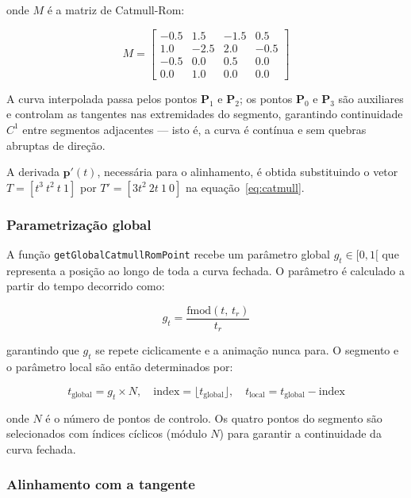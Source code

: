 \documentclass[12pt,a4paper]{article}
\begin{document}
onde $M$ é a matriz de Catmull-Rom:

\begin{equation}
    M = \begin{bmatrix}
        -0.5 &  1.5 & -1.5 &  0.5 \\
         1.0 & -2.5 &  2.0 & -0.5 \\
        -0.5 &  0.0 &  0.5 &  0.0 \\
         0.0 &  1.0 &  0.0 &  0.0
    \end{bmatrix}
\end{equation}

A curva interpolada passa pelos pontos $\mathbf{P}_1$ e $\mathbf{P}_2$; os pontos $\mathbf{P}_0$ e $\mathbf{P}_3$ são auxiliares e controlam as tangentes nas extremidades do segmento, garantindo continuidade $C^1$ entre segmentos adjacentes — isto é, a curva é contínua e sem quebras abruptas de direção.

A derivada $\mathbf{p}'(t)$, necessária para o alinhamento, é obtida substituindo o vetor $T = [t^3\ t^2\ t\ 1]$ por $T' = [3t^2\ 2t\ 1\ 0]$ na equação~\eqref{eq:catmull}.

\subsubsection{Parametrização global}

A função \texttt{getGlobalCatmullRomPoint} recebe um parâmetro global $g_t \in [0, 1[$ que representa a posição ao longo de toda a curva fechada. O parâmetro é calculado a partir do tempo decorrido como:

\begin{equation}
    g_t = \frac{\text{fmod}(t,\, t_r)}{t_r}
\end{equation}

garantindo que $g_t$ se repete ciclicamente e a animação nunca para. O segmento e o parâmetro local são então determinados por:

\begin{equation}
    t_{\text{global}} = g_t \times N, \quad
    \text{index} = \lfloor t_{\text{global}} \rfloor, \quad
    t_{\text{local}} = t_{\text{global}} - \text{index}
\end{equation}

onde $N$ é o número de pontos de controlo. Os quatro pontos do segmento são selecionados com índices cíclicos (módulo $N$) para garantir a continuidade da curva fechada.

\subsubsection{Alinhamento com a tangente}
\end{document}
